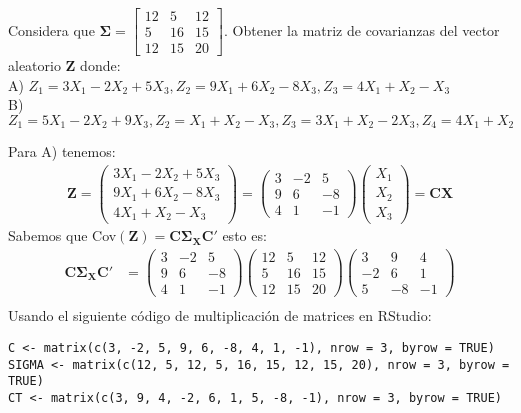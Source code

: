 \begin{problem}{4}
Considera que $\mathbf{\Sigma}= \begin{bmatrix}
12&5&12\\
5&16&15\\
12&15&20
\end{bmatrix}$. Obtener la matriz de covarianzas del vector aleatorio \textbf{Z} donde:\\
A) $Z_1=3X_1-2X_2+5X_3, Z_2=9X_1+6X_2-8X_3,Z_3=4X_1+X_2-X_3$\\
B) $Z_1=5X_1-2X_2+9X_3, Z_2=X_1+X_2-X_3,Z_3=3X_1+X_2-2X_3,Z_4=4X_1+X_2$
\end{problem}
\begin{sol}
Para A) tenemos:
\begin{align*}
\mathbf{Z}=\begin{pmatrix}
3X_1-2X_2+5X_3\\
9X_1+6X_2-8X_3\\
4X_1+X_2-X_3
\end{pmatrix} =
\begin{pmatrix}
3 & -2 & 5\\
9 & 6 & -8 \\
4 & 1 &-1
\end{pmatrix}
\begin{pmatrix}
X_1\\X_2\\X_3
\end{pmatrix} = \mathbf{CX}
\end{align*}
Sabemos que Cov$(\mathbf{Z}) = \mathbf{C \Sigma_X C'}$ esto es:
\begin{align*}
\mathbf{C \Sigma_X C'} &= \begin{pmatrix}
3 & -2 & 5\\
9 & 6 & -8 \\
4 & 1 &-1
\end{pmatrix}
\begin{pmatrix}
12&5&12\\
5&16&15\\
12&15&20
\end{pmatrix}
\begin{pmatrix}
3 & 9 & 4\\
-2 & 6 & 1 \\
5 & -8 &-1
\end{pmatrix}\\
\end{align*}
Usando el siguiente código de multiplicación de matrices en RStudio:
\begin{verbatim}
C <- matrix(c(3, -2, 5, 9, 6, -8, 4, 1, -1), nrow = 3, byrow = TRUE)
SIGMA <- matrix(c(12, 5, 12, 5, 16, 15, 12, 15, 20), nrow = 3, byrow = TRUE)
CT <- matrix(c(3, 9, 4, -2, 6, 1, 5, -8, -1), nrow = 3, byrow = TRUE)


\end{verbatim}
\end{sol}
